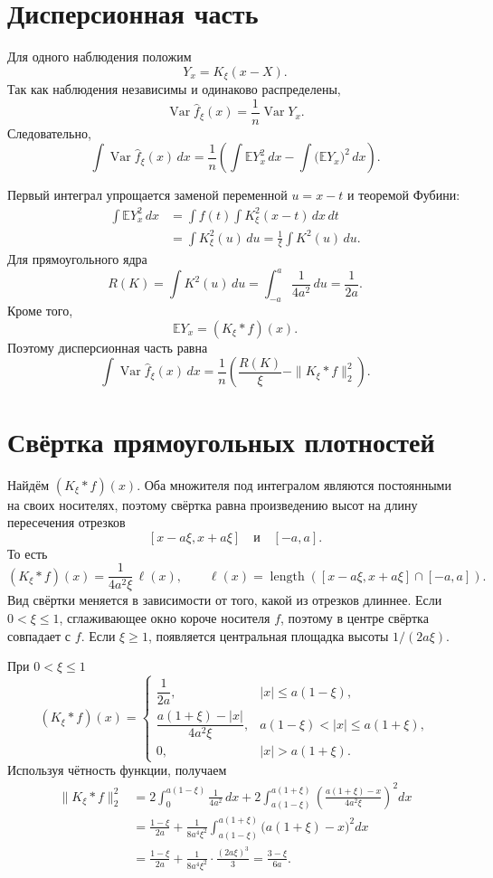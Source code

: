 \documentclass[12pt,a4paper]{article}
\begin{document}
\section*{Дисперсионная часть}

Для одного наблюдения положим
\[
Y_x=K_\xi(x-X).
\]
Так как наблюдения независимы и одинаково распределены,
\[
\operatorname{Var}\widehat f_\xi(x)
=\frac{1}{n}\operatorname{Var}Y_x.
\]
Следовательно,
\[
\int \operatorname{Var}\widehat f_\xi(x)\,dx
=\frac{1}{n}
\left(
\int \mathbb E Y_x^2\,dx
-\int \bigl(\mathbb E Y_x\bigr)^2\,dx
\right).
\]

Первый интеграл упрощается заменой переменной $u=x-t$ и теоремой Фубини:
\[
\begin{aligned}
\int \mathbb E Y_x^2\,dx
&=\int f(t)\int K_\xi^2(x-t)\,dx\,dt\\
&=\int K_\xi^2(u)\,du
=\frac{1}{\xi}\int K^2(u)\,du.
\end{aligned}
\]
Для прямоугольного ядра
\[
R(K)=\int K^2(u)\,du
=\int_{-a}^{a}\frac{1}{4a^2}\,du
=\frac{1}{2a}.
\]
Кроме того,
\[
\mathbb E Y_x=(K_\xi*f)(x).
\]
Поэтому дисперсионная часть равна
\[
\int \operatorname{Var}\widehat f_\xi(x)\,dx
=\frac{1}{n}
\left(
\frac{R(K)}{\xi}-\|K_\xi*f\|_2^2
\right).
\]

\section*{Свёртка прямоугольных плотностей}

Найдём $(K_\xi*f)(x)$. Оба множителя под интегралом являются постоянными на
своих носителях, поэтому свёртка равна произведению высот на длину
пересечения отрезков
\[
[x-a\xi,x+a\xi]\quad\text{и}\quad[-a,a].
\]
То есть
\[
(K_\xi*f)(x)
=\frac{1}{4a^2\xi}\,\ell(x),
\qquad
\ell(x)=
\operatorname{length}\left([x-a\xi,x+a\xi]\cap[-a,a]\right).
\]
Вид свёртки меняется в зависимости от того, какой из отрезков длиннее.
Если $0<\xi\le 1$, сглаживающее окно короче носителя $f$, поэтому в центре
свёртка совпадает с $f$. Если $\xi\ge 1$, появляется центральная площадка
высоты $1/(2a\xi)$.

При $0<\xi\le 1$
\[
(K_\xi*f)(x)=
\begin{cases}
\dfrac{1}{2a}, & |x|\le a(1-\xi),\\[6pt]
\dfrac{a(1+\xi)-|x|}{4a^2\xi},
& a(1-\xi)<|x|\le a(1+\xi),\\[6pt]
0, & |x|>a(1+\xi).
\end{cases}
\]
Используя чётность функции, получаем
\[
\begin{aligned}
\|K_\xi*f\|_2^2
&=2\int_0^{a(1-\xi)}\frac{1}{4a^2}\,dx
+2\int_{a(1-\xi)}^{a(1+\xi)}
\left(\frac{a(1+\xi)-x}{4a^2\xi}\right)^2 dx\\
&=\frac{1-\xi}{2a}
+\frac{1}{8a^4\xi^2}
\int_{a(1-\xi)}^{a(1+\xi)}
\bigl(a(1+\xi)-x\bigr)^2 dx\\
&=\frac{1-\xi}{2a}
+\frac{1}{8a^4\xi^2}\cdot\frac{(2a\xi)^3}{3}
=\frac{3-\xi}{6a}.
\end{aligned}
\]
\end{document}
